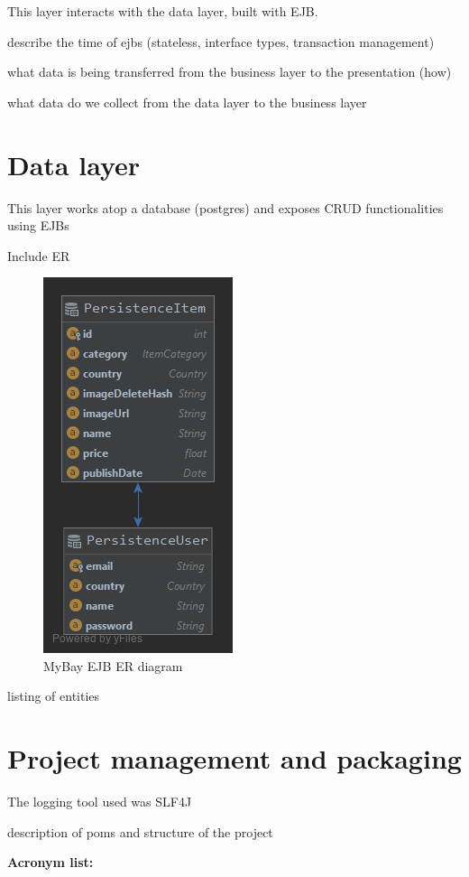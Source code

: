 \documentclass{article}
\begin{document}
\qquad This layer interacts with the data layer, built with \ac{EJB}.

\qquad describe the time of ejbs (stateless, interface types, transaction management)

\qquad what data is being transferred from the business layer to the presentation (how)

\qquad what data do we collect from the data layer to the business layer





\section{Data layer}

\qquad This layer works atop a database (postgres) and exposes CRUD functionalities using \ac{EJB}s

\qquad Include ER

\begin{figure}[hbt!]
 \centering
 \includegraphics[scale=0.4]{ER_MyBay.png}
 \caption{MyBay \ac{EJB} \ac{ER} diagram }
\end{figure}

\qquad listing of entities






\section{Project management and packaging}

\qquad The logging tool used was \ac{SLF4J}

\qquad description of poms and structure of the project






\textbf{Acronym list:}

\begin{acronym}
\end{acronym}
\end{document}
